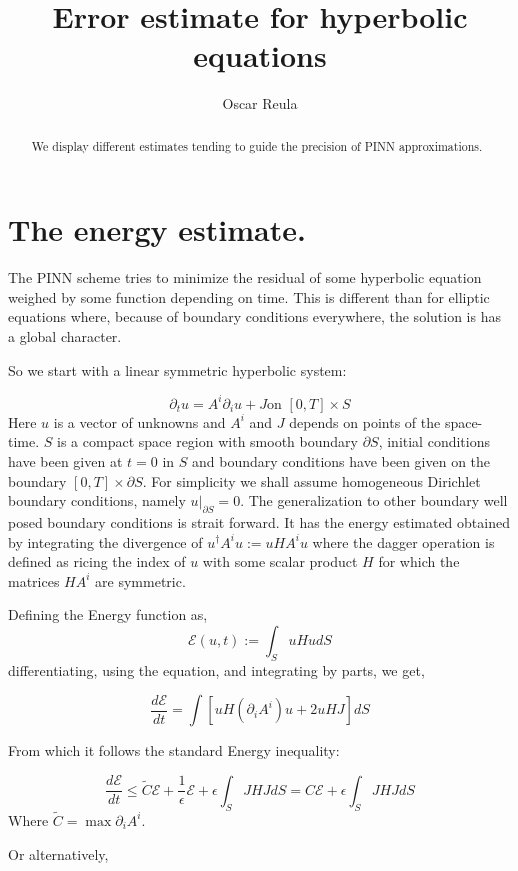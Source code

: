 \documentclass[11pt]{amsart}
\title{Error estimate for hyperbolic equations }
\author{Oscar Reula}
\theoremstyle{proof}
\theoremstyle{definition}
\theoremstyle{example}
\theoremstyle{remark}
\numberwithin{equation}{section}
\begin{document}
\begin{abstract}
We display different estimates tending to guide the precision of PINN approximations. 
\end{abstract}

\maketitle


\section{The energy estimate.}

The PINN scheme tries to minimize the residual of some hyperbolic equation weighed by some function depending on time. This is different than for elliptic equations where, because of boundary conditions everywhere, the solution is has a global character. 

So we start with a linear symmetric hyperbolic system:

$$
\partial_t u = A^i \partial_i u + J \text{on } [0,T] \times S
$$
Here $u$ is a vector of unknowns and $A^i$ and $J$ depends on points of the space-time. $S$ is a compact space region with smooth boundary $\partial S$,
initial conditions have been given at $t=0$ in $S$ and boundary conditions have been given on the boundary $[0,T]\times \partial S$. For simplicity we shall assume homogeneous Dirichlet boundary conditions, namely $u|_{\partial S} = 0$. The generalization to other boundary well posed boundary conditions is strait forward. 
It has the energy estimated obtained by integrating the divergence of $u^{\dagger} A^i u := u HA^i u$ where the dagger operation is defined as ricing the index of $u$ with some scalar product $H$ for which the matrices $HA^i$ are symmetric.

Defining the Energy function as, 
$$
\mathcal{E}(u,t) := \int_S u Hu dS
$$ 
differentiating, using the equation, and integrating by parts,  we get, 

$$
\frac{d\mathcal{E}}{dt} = \int [uH(\partial_i A^i )u + 2 uHJ] dS
$$ 

From which it follows the standard Energy inequality:

$$
\frac{d\mathcal{E}}{dt} \leq \tilde{C}\mathcal{E} +  \frac{1}{\epsilon} \mathcal{E} + \epsilon \int_{S} JHJ dS = C  \mathcal{E} + \epsilon \int_{S} JHJ dS  
$$
%
Where $\tilde{C} = \max{\partial_i A^i}$.

Or alternatively, 
\end{document}
